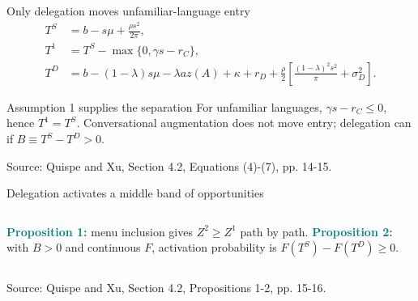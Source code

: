 \documentclass[aspectratio=169,11pt]{beamer}
\newcommand{\source}[1]{%
  \vfill\par\begingroup\color{gray!75!black}\fontsize{7}{8}\selectfont
  Source: #1\par\endgroup}
\newcommand{\key}[1]{\textcolor{Teal}{\textbf{#1}}}
\begin{document}
\begin{frame}{Only delegation moves unfamiliar-language entry}
  \small
  \begin{align*}
    T^S &= b-s\mu+\frac{\rho s^2}{2\pi},\\[2pt]
    T^1 &= T^S-\max\{0,\gamma s-r_C\},\\[2pt]
    T^D &= b-(1-\lambda)s\mu-\lambda a z(A)+\kappa+r_D
    +\frac{\rho}{2}\left[\frac{(1-\lambda)^2s^2}{\pi}+\sigma_D^2\right].
  \end{align*}
  \vspace{-0.15cm}
  \begin{block}{Assumption 1 supplies the separation}
    For unfamiliar languages, \(\gamma s-r_C\le0\), hence \(T^1=T^S\). Conversational augmentation does not move entry; delegation can if \(B\equiv T^S-T^D>0\).
  \end{block}
  \source{Quispe and Xu, Section 4.2, Equations (4)-(7), pp. 14-15.}
\end{frame}

\begin{frame}{Delegation activates a middle band of opportunities}
  \centering
  \vspace{0.35cm}
  \begin{columns}[T,onlytextwidth]
      \key{Proposition 1:} menu inclusion gives \(Z^2\ge Z^1\) path by path.
      \key{Proposition 2:} with \(B>0\) and continuous \(F\), activation probability is \(F(T^S)-F(T^D)\ge0\).
  \end{columns}
  \source{Quispe and Xu, Section 4.2, Propositions 1-2, pp. 15-16.}
\end{frame}
\end{document}
